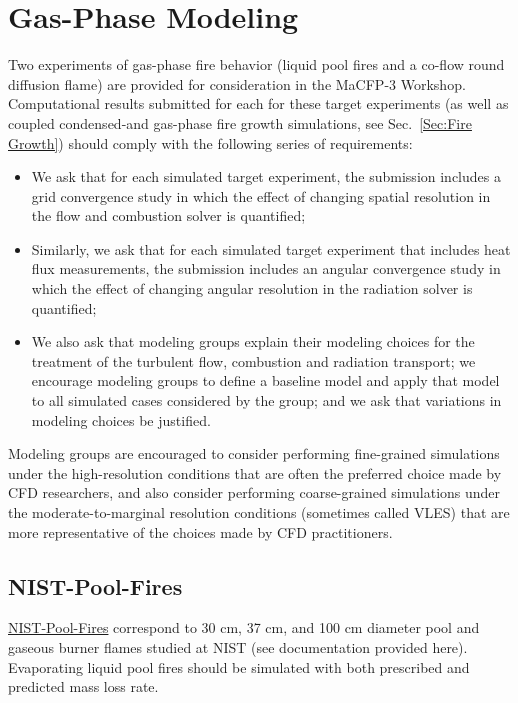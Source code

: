 \documentclass[12pt]{article}
\begin{document}

\clearpage
\section{Gas-Phase Modeling}
\label{Sec:Gas Phase}
Two experiments of gas-phase fire behavior (liquid pool fires and a co-flow round diffusion flame) are provided for consideration in the MaCFP-3 Workshop.  Computational results submitted for each for these target experiments (as well as coupled condensed-and gas-phase fire growth simulations, see Sec.~\ref{Sec:Fire Growth}) should comply with the following series of requirements:

\begin{itemize}[noitemsep]
\item We ask that for each simulated target experiment, the submission includes a grid convergence study in which the effect of changing spatial resolution in the flow and combustion solver is quantified;
\item Similarly, we ask that for each simulated target experiment that includes heat flux measurements, the submission includes an angular convergence study in which the effect of changing angular resolution in the radiation solver is quantified;
\item We also ask that modeling groups explain their modeling choices for the treatment of the turbulent flow, combustion and radiation transport; we encourage modeling groups to define a baseline model and apply that model to all simulated cases considered by the group; and we ask that variations in modeling choices be justified.
 \end{itemize}

Modeling groups are encouraged to consider performing fine-grained simulations under the high-resolution conditions that are often the preferred choice made by CFD researchers, and also consider performing coarse-grained simulations under the moderate-to-marginal resolution conditions (sometimes called VLES) that are more representative of the choices made by CFD practitioners.

\subsection{NIST-Pool-Fires}
\href{https://github.com/MaCFP/macfp-db/tree/master/Liquid_Pool_Fires/NIST_Pool_Fires}{NIST-Pool-Fires} correspond to 30 cm, 37 cm, and 100 cm diameter pool and gaseous burner flames studied at NIST (see documentation provided here). Evaporating liquid pool fires should be simulated with both prescribed and predicted mass loss rate.
\end{document}
